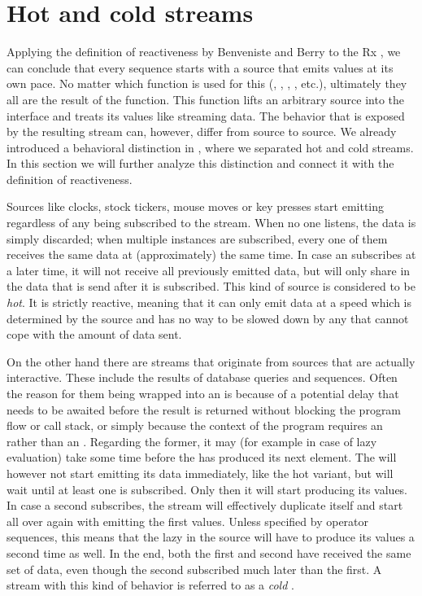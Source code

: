 \section{Hot and cold streams}
Applying the definition of reactiveness by Benveniste and Berry \cite{berry1991-Reactive} to the Rx \obs, we can conclude that every \obs sequence starts with a source that emits values at its own pace. No matter which function is used for this (, , , , etc.), ultimately they all are the result of the  function. This function lifts an arbitrary source into the \obs interface and treats its values like streaming data. The behavior that is exposed by the resulting stream can, however, differ from source to source. We already introduced a behavioral distinction in , where we separated hot and cold streams. In this section we will further analyze this distinction and connect it with the definition of reactiveness. 

Sources like clocks, stock tickers, mouse moves or key presses start emitting regardless of any \obv being subscribed to the stream. When no one listens, the data is simply discarded; when multiple \obv instances are subscribed, every one of them receives the same data at (approximately) the same time. In case an \obv subscribes at a later time, it will not receive all previously emitted data, but will only share in the data that is send after it is subscribed. This kind of source is considered to be \textit{hot}. It is strictly reactive, meaning that it can only emit data at a speed which is determined by the source and has no way to be slowed down by any \obv that cannot cope with the amount of data sent.

On the other hand there are streams that originate from sources that are actually interactive. These include the results of database queries and \ieb sequences. Often the reason for them being wrapped into an \obs is because of a potential delay that needs to be awaited before the result is returned without blocking the program flow or call stack, or simply because the context of the program requires an \obs rather than an \ieb. Regarding the former, it may (for example in case of lazy evaluation) take some time before the \ier has produced its next element. The \obs will however not start emitting its data immediately, like the hot variant, but will wait until at least one \obv is subscribed. Only then it will start producing its values. In case a second \obv subscribes, the stream will effectively duplicate itself and start all over again with emitting the first values. Unless specified by operator sequences, this means that the lazy \ier in the source will have to produce its values a second time as well. In the end, both the first and second \obv have received the same set of data, even though the second subscribed much later than the first. A stream with this kind of behavior is referred to as a \textit{cold} \obs.


